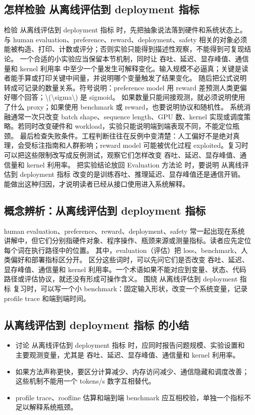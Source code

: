 \documentclass[a4paper]{article}
\begin{document}
\subsection{怎样检验 从离线评估到 deployment 指标}
检验 从离线评估到 deployment 指标 时，先把抽象说法落到硬件和系统状态上。与 human evaluation、preference、reward、deployment、safety 相关的对象必须能被构造、打印、计数或评分；否则实验只能得到描述性观察，不能得到可复现结论。
一个合适的小实验应当保留本节机制，同时让 吞吐、延迟、显存峰值、通信量和 kernel 利用率 中至少一个量发生可解释变化。输入规模不必逼真；关键是读者能手算或打印关键中间量，并说明哪个变量触发了结果变化。
随后把公式说明转成可记录的数量关系。符号说明：preference model 用 reward 差预测人类更偏好哪个回答；\textbackslash{}(\textbackslash{}sigma\textbackslash{}) 是 sigmoid。 如果数量只能间接观测，就必须说明使用了什么 proxy；如果使用 benchmark 或 reward，也要说明协议和随机性。
系统消融通常一次只改变 batch shape、sequence length、GPU 数、kernel 实现或调度策略。若同时改变硬件和 workload，实验只能说明端到端表现不同，不能定位瓶颈。
最后检查失败条件。工程判断往往在反例中变清楚：人工偏好不是绝对真理，会受标注指南和人群影响；reward model 可能被优化过程 exploited。复习时可以把这些限制改写成反例测试，观察它们怎样改变 吞吐、延迟、显存峰值、通信量和 kernel 利用率。
把实验结论放回 Evaluation 方法论 时，要说明 从离线评估到 deployment 指标 改变的是训练吞吐、推理延迟、显存峰值还是通信开销。能做出这种归因，才说明读者已经从接口使用进入系统解释。
\subsection{概念辨析：从离线评估到 deployment 指标}
human evaluation、preference、reward、deployment、safety 常一起出现在系统讲解中，但它们分别指硬件对象、程序操作、瓶颈来源或测量指标。读者应先定位每个词在执行路径中的位置。
其中，evaluation（评估）把 loss、benchmark、人类偏好和部署指标区分开。
区分这些词时，可以先问它们是否改变 吞吐、延迟、显存峰值、通信量和 kernel 利用率。一个术语如果不能对应到变量、状态、代码路径或评估协议，就还没有形成可操作含义。
围绕 从离线评估到 deployment 指标 复习时，可以写一个小 benchmark：固定输入形状，改变一个系统变量，记录 profile trace 和端到端时间。
\subsection{从离线评估到 deployment 指标 的小结}
\begin{itemize}
\item 讨论 从离线评估到 deployment 指标 时，应同时报告问题规模、实验设置和主要观测变量，尤其是 吞吐、延迟、显存峰值、通信量和 kernel 利用率。
\item 如果方法声称更快，要区分计算减少、内存访问减少、通信隐藏和调度改善；这些机制不能用一个 tokens/s 数字互相替代。
\item profile trace、roofline 估算和端到端 benchmark 应互相校验，单独一个指标不足以解释系统瓶颈。
\end{itemize}
\end{document}
